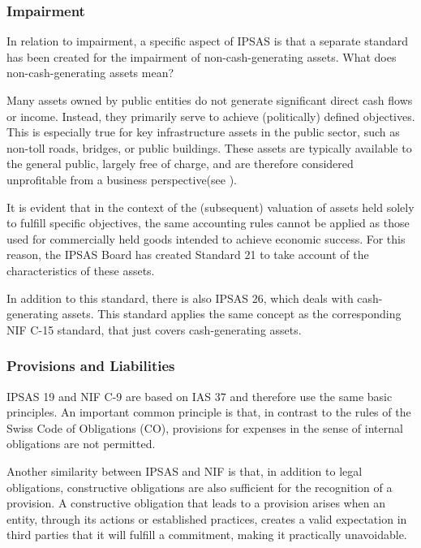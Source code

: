 \documentclass[10pt]{article}
\begin{document}
\subsubsection{Impairment}\label{subsubsec:impairment}
In relation to impairment, a specific aspect of IPSAS is that a separate standard has been created for the impairment of non-cash-generating assets. What does non-cash-generating assets mean?

Many assets owned by public entities do not generate significant direct cash flows or income. Instead, they primarily serve to achieve (politically) defined objectives. This is especially true for key infrastructure assets in the public sector, such as non-toll roads, bridges, or public buildings. These assets are typically available to the general public, largely free of charge, and are therefore considered unprofitable from a business perspective(see \cite[p.~345]{IPSASPraxisHB}).

It is evident that in the context of the (subsequent) valuation of assets held solely to fulfill specific objectives, the same accounting rules cannot be applied as those used for commercially held goods intended to achieve economic success. For this reason, the IPSAS Board has created Standard 21 to take account of the characteristics of these assets.

In addition to this standard, there is also IPSAS 26, which deals with cash-generating assets. This standard applies the same concept as the corresponding NIF C-15 standard, that just covers cash-generating assets.

\subsubsection{Provisions and Liabilities}\label{subsubsec:provisions_and_liabilities}
IPSAS 19 and NIF C-9 are based on IAS 37 and therefore use the same basic principles. An important common principle is that, in contrast to the rules of the Swiss Code of Obligations (CO), provisions for expenses in the sense of internal obligations are not permitted.

Another similarity between IPSAS and NIF is that, in addition to legal obligations, constructive obligations are also sufficient for the recognition of a provision. A constructive obligation that leads to a provision arises when an entity, through its actions or established practices, creates a valid expectation in third parties that it will fulfill a commitment, making it practically unavoidable.
\end{document}
